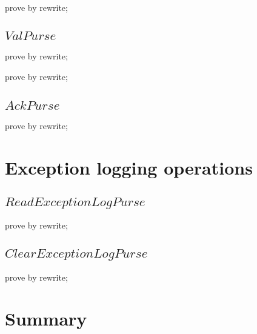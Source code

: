 \begin{LDCheck}\begin{zproof}
   prove by rewrite;
\end{zproof}\end{LDCheck}

\subsection{$ValPurse$}

\begin{LDCheck}\begin{zproof}
   prove by rewrite;
\end{zproof}\end{LDCheck}

\begin{LDCheck}\begin{zproof}
   prove by rewrite;
\end{zproof}\end{LDCheck}

\subsection{$AckPurse$}

\begin{LDCheck}\begin{zproof}
   prove by rewrite;
\end{zproof}\end{LDCheck}

\section{Exception logging operations}

\subsection{$ReadExceptionLogPurse$}

\begin{LDCheck}\begin{zproof}
   prove by rewrite;
\end{zproof}\end{LDCheck}

\subsection{$ClearExceptionLogPurse$}

\begin{LDCheck}\begin{zproof}
   prove by rewrite;
\end{zproof}\end{LDCheck}


\newpage
\section{Summary}\label{ch4.ps.summary}
\lpscriptsummary

